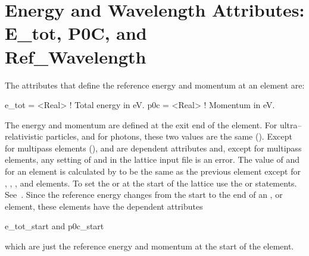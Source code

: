 \section[Energy and Wavelength Attributes]{Energy and Wavelength Attributes: E_tot, P0C, and \\ Ref_Wavelength}
\label{s:energy}

The attributes that define the reference energy and momentum at an element are:
\begin{example}
  e_tot  = <Real>  ! Total energy in eV.
  p0c    = <Real>  ! Momentum in eV.
\end{example}
The energy and momentum are defined at the exit end of the element.  For ultra--relativistic
particles, and for photons, these two values are the same (). Except for
multipass elements (),  and  are dependent attributes and,
except for multipass elements, any setting of  and  in the lattice input file is
an error. The value of  and  for an element is calculated by \bmad to be the same
as the previous element except for , , , and 
elements. To set the  or  at the start of the lattice use the  or
 statements.  See~. Since the reference energy changes from the start to
the end of an ,  or  element, these elements have the
dependent attributes
\begin{example}
  e_tot_start   and
  p0c_start
\end{example}
which are just the reference energy and momentum at the start of the element.

